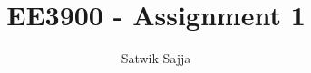 \documentclass[journal,12pt,twocolumn]{IEEEtran}
\begin{document}

\def\putbox#1#2#3{\makebox[0in][l]{\makebox[#1][l]{}\raisebox{\baselineskip}[0in][0in]{\raisebox{#2}[0in][0in]{#3}}}}
     \def\rightbox#1{\makebox[0in][r]{#1}}
     \def\centbox#1{\makebox[0in]{#1}}
     \def\topbox#1{\raisebox{-\baselineskip}[0in][0in]{#1}}
     \def\midbox#1{\raisebox{-0.5\baselineskip}[0in][0in]{#1}}

\vspace{3cm}

\title{ 
EE3900 - Assignment 1%
}


%
%
%

\author{ Satwik Sajja%
}
% 
%
\end{document}
